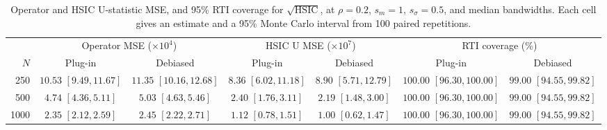 \begin{table}[htbp]
\centering\small
\caption{Operator and HSIC U-statistic MSE, and 95\% RTI coverage for $\sqrt{\mathrm{HSIC}}$, at $\rho=0.2$, $s_m=1$, $s_\sigma=0.5$, and median bandwidths. Each cell gives an estimate and a 95\% Monte Carlo interval from 100 paired repetitions.}
\label{tab:debiasing-mse-rho0p2}
\setlength{\tabcolsep}{4pt}\renewcommand{\arraystretch}{1.3}
\begin{tabular}{@{}rcccccc@{}}\toprule
& \multicolumn{2}{c}{Operator MSE ($\times 10^{4}$)} & \multicolumn{2}{c}{HSIC U MSE ($\times 10^{7}$)} & \multicolumn{2}{c}{RTI coverage (\%)}\\
\cmidrule(lr){2-3}\cmidrule(lr){4-5}\cmidrule(l){6-7}
$N$ & Plug-in & Debiased & Plug-in & Debiased & Plug-in & Debiased\\\midrule
250 & \shortstack{$10.53$\\{\scriptsize $[9.49,11.67]$}} & \shortstack{$11.35$\\{\scriptsize $[10.16,12.68]$}} & \shortstack{$8.36$\\{\scriptsize $[6.02,11.18]$}} & \shortstack{$8.90$\\{\scriptsize $[5.71,12.79]$}} & \shortstack{$100.00$\\{\scriptsize $[96.30,100.00]$}} & \shortstack{$99.00$\\{\scriptsize $[94.55,99.82]$}}\\[3pt]
500 & \shortstack{$4.74$\\{\scriptsize $[4.36,5.11]$}} & \shortstack{$5.03$\\{\scriptsize $[4.63,5.46]$}} & \shortstack{$2.40$\\{\scriptsize $[1.76,3.11]$}} & \shortstack{$2.19$\\{\scriptsize $[1.48,3.00]$}} & \shortstack{$100.00$\\{\scriptsize $[96.30,100.00]$}} & \shortstack{$99.00$\\{\scriptsize $[94.55,99.82]$}}\\[3pt]
1000 & \shortstack{$2.35$\\{\scriptsize $[2.12,2.59]$}} & \shortstack{$2.45$\\{\scriptsize $[2.22,2.71]$}} & \shortstack{$1.12$\\{\scriptsize $[0.78,1.51]$}} & \shortstack{$1.00$\\{\scriptsize $[0.62,1.47]$}} & \shortstack{$100.00$\\{\scriptsize $[96.30,100.00]$}} & \shortstack{$99.00$\\{\scriptsize $[94.55,99.82]$}}\\[3pt]
\bottomrule\end{tabular}
\end{table}
